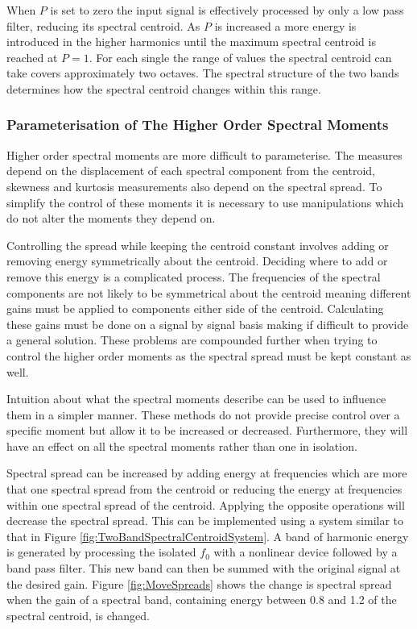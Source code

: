 			When $P$ is set to zero the input signal is effectively processed by only a low pass filter,
			reducing its spectral centroid. As $P$ is increased a more energy is introduced in the higher
			harmonics until the maximum spectral centroid is reached at $P = 1$. For each single the range of
			values the spectral centroid can take covers approximately two octaves. The spectral structure of
			the two bands determines how the spectral centroid changes within this range.

		\subsubsection*{Parameterisation of The Higher Order Spectral Moments}
			Higher order spectral moments are more difficult to parameterise. The measures depend on the
			displacement of each spectral component from the centroid, skewness and kurtosis measurements also
			depend on the spectral spread. To simplify the control of these moments it is necessary to use
			manipulations which do not alter the moments they depend on. 
			
			Controlling the spread while keeping the centroid constant involves adding or removing energy
			symmetrically about the centroid. Deciding where to add or remove this energy is a complicated
			process. The frequencies of the spectral components are not likely to be symmetrical about the
			centroid meaning different gains must be applied to components either side of the centroid.
			Calculating these gains must be done on a signal by signal basis making if difficult to provide a
			general solution. These problems are compounded further when trying to control the higher order
			moments as the spectral spread must be kept constant as well.

			Intuition about what the spectral moments describe can be used to influence them in a simpler
			manner. These methods do not provide precise control over a specific moment but allow it to be
			increased or decreased.  Furthermore, they will have an effect on all the spectral moments rather
			than one in isolation. 
			
			Spectral spread can be increased by adding energy at frequencies which are more that one spectral
			spread from the centroid or reducing the energy at frequencies within one spectral spread of the
			centroid.  Applying the opposite operations will decrease the spectral spread. This can be
			implemented using a system similar to that in Figure \ref{fig:TwoBandSpectralCentroidSystem}. A
			band of harmonic energy is generated by processing the isolated $f_{0}$ with a nonlinear device
			followed by a band pass filter. This new band can then be summed with the original signal at the
			desired gain. Figure \ref{fig:MoveSpreads} shows the change is spectral spread when the gain of a
			spectral band, containing energy between 0.8 and 1.2 of the spectral centroid, is changed.

